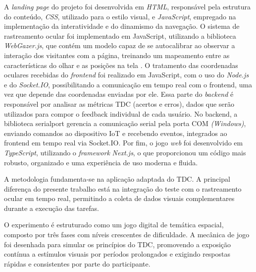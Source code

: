 A \textit{landing page} do projeto foi desenvolvida em \textit{HTML}, responsável pela estrutura do conteúdo, \textit{CSS}, utilizado para o estilo visual, e \textit{JavaScript}, empregado na implementação da interatividade e do dinamismo da navegação. O sistema de rastreamento ocular foi implementado em JavaScript, utilizando a biblioteca \textit{WebGazer.js}, que contém um modelo capaz de se autocalibrar ao observar a interação dos visitantes com a página, treinando um mapeamento entre as características do olhar e as posições na tela \cite{papoutsaki2016webgazer}. O tratamento das coordenadas oculares recebidas do \textit{frontend} foi realizado em JavaScript, com o uso do \textit{Node.js} e do \textit{Socket.IO}, possibilitando a comunicação em tempo real com o frontend, uma vez que depende das coordenadas enviadas por ele. Essa parte do \textit{backend} é responsável por analisar as métricas TDC (acertos e erros), dados que serão utilizados para compor o feedback individual de cada usuário. No backend, a biblioteca serialport gerencia a comunicação serial pela porta COM \textit{(Windows)}, enviando comandos ao dispositivo IoT e recebendo eventos, integrados ao frontend em tempo real via Socket.IO. Por fim, o jogo \textit{web} foi desenvolvido em \textit{TypeScript}, utilizando o \textit{framework} \textit{Next.js}, o que proporcionou um código mais robusto, organizado e uma experiência de uso moderna e fluida.

A metodologia fundamenta-se na aplicação adaptada do TDC. A principal diferença do presente trabalho está na integração do teste com o rastreamento ocular em tempo real, permitindo a coleta de dados visuais complementares durante a execução das tarefas.

O experimento é estruturado como um jogo digital de temática espacial, composto por três fases com níveis crescentes de dificuldade. A mecânica de jogo foi desenhada para simular os princípios do TDC, promovendo a exposição contínua a estímulos visuais por períodos prolongados e exigindo respostas rápidas e consistentes por parte do participante. 

